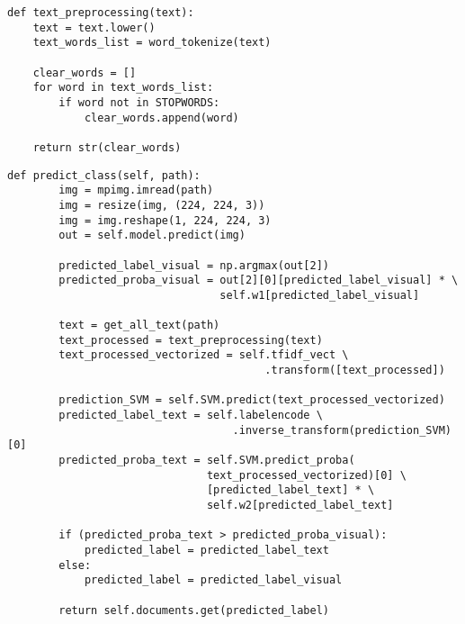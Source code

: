 \begin{lstlisting}[caption=Предобработка текста, label = lst:text, style=realcode]
def text_preprocessing(text):
    text = text.lower()
    text_words_list = word_tokenize(text)

    clear_words = []
    for word in text_words_list:
        if word not in STOPWORDS:
            clear_words.append(word)

    return str(clear_words)
\end{lstlisting}

\begin{lstlisting}[caption=Ансамбль классификаторов, label = lst:concat, style=realcode]
def predict_class(self, path):
        img = mpimg.imread(path)
        img = resize(img, (224, 224, 3))
        img = img.reshape(1, 224, 224, 3)
        out = self.model.predict(img)

        predicted_label_visual = np.argmax(out[2])
        predicted_proba_visual = out[2][0][predicted_label_visual] * \
                                 self.w1[predicted_label_visual]

        text = get_all_text(path)
        text_processed = text_preprocessing(text)
        text_processed_vectorized = self.tfidf_vect \
                                        .transform([text_processed])

        prediction_SVM = self.SVM.predict(text_processed_vectorized)
        predicted_label_text = self.labelencode \
                                   .inverse_transform(prediction_SVM)[0]
        predicted_proba_text = self.SVM.predict_proba(
                               text_processed_vectorized)[0] \
                               [predicted_label_text] * \
                               self.w2[predicted_label_text]

        if (predicted_proba_text > predicted_proba_visual):
            predicted_label = predicted_label_text
        else:
            predicted_label = predicted_label_visual

        return self.documents.get(predicted_label)
\end{lstlisting}
